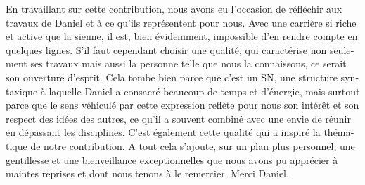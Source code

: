 \documentclass[french, output=paper]{langscibook}
\begin{document}
\begin{otherlanguage}{french}
En travaillant sur cette contribution, nous avons eu l’occasion de réfléchir aux travaux de Daniel et à ce qu’ils représentent pour nous. Avec une carrière si riche et active que la sienne, il est, bien évidemment, impossible d’en rendre compte en quelques lignes. S’il faut cependant choisir une qualité, qui caractérise non seulement ses travaux mais aussi la personne telle que nous la connaissons, ce serait son ouverture d’esprit. Cela tombe bien parce que c’est un SN, une structure syntaxique à laquelle Daniel a consacré beaucoup de temps et d’énergie, mais surtout parce que le sens véhiculé par cette expression reflète pour nous son intérêt et son respect des idées des autres, ce qu’il a souvent combiné avec une envie de réunir en dépassant les disciplines. C’est également cette qualité qui a inspiré la thématique de notre contribution. A tout cela s’ajoute, sur un plan plus personnel, une gentillesse et une bienveillance exceptionnelles que nous avons pu apprécier à maintes reprises et dont nous tenons à le remercier. Merci Daniel.

\printbibliography[heading=subbibliography,notkeyword=this]
\end{otherlanguage}
\end{document}
